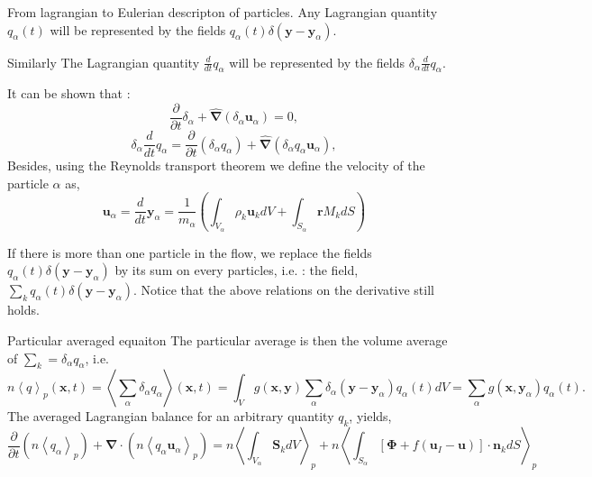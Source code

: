 \documentclass{sintefbeamer}
\newcommand{\avg}[1]{\left<#1\right>}
\newcommand{\pavg}[1]{n \left<#1\right>_p}
\newcommand{\nablab}{\bm{\nabla}}
\newcommand{\nablabh}{\hat{\bm{\nabla}}}
\newcommand{\ddt}{\frac{d}{d t}}
\newcommand{\pddt}{\frac{\partial}{\partial t}}
\begin{document}
\begin{frame}{From lagrangian to Eulerian descripton of particles.}
  Any Lagrangian quantity $q_\alpha(t)$ will be represented by the fields $q_\alpha(t)\delta(\textbf{y}-\textbf{y}_\alpha)$.

  Similarly The Lagrangian quantity $\ddt q_\alpha$ will be represented by the fields $\delta_\alpha \ddt q_\alpha$.

  It can be shown that : 
  \begin{equation*}
    \pddt \delta_\alpha
    + \nablabh (\delta_\alpha \textbf{u}_\alpha)
    = 0,
    \label{eq:delta_q_alpha_dt}
\end{equation*}
\begin{equation*}
    \delta_\alpha \ddt q_\alpha
    = \pddt (\delta_\alpha q_\alpha)
    + \nablabh (\delta_\alpha q_\alpha \textbf{u}_\alpha),
    \label{eq:delta_q_alpha_dt}
\end{equation*}
Besides, using the Reynolds transport theorem we define the velocity of the particle $\alpha$ as,  
\begin{equation*}
  \textbf{u}_\alpha
  = \ddt \textbf{y}_\alpha
  = \frac{1}{m_\alpha} \left(
      \int_{V_\alpha} \rho_k \textbf{u}_k dV
      +  \int_{S_\alpha} \textbf{r} M_k dS
  \right)
\end{equation*}

If there is more than one particle in the flow, we replace the fields $q_\alpha(t)\delta(\textbf{y}-\textbf{y}_\alpha)$ by its sum on every particles, i.e. : the field, $\sum_k q_\alpha(t)\delta(\textbf{y}-\textbf{y}_\alpha)$.
Notice that the above relations on the derivative still holds.
\end{frame}


\begin{frame}{Particular averaged equaiton}  
  The particular average is then the volume average of $\sum_k = \delta_\alpha q_\alpha$, i.e.
  \begin{equation*}
    \pavg{q}(\textbf{x},t)
    = \avg{\sum_\alpha \delta_\alpha q_\alpha} (\textbf{x},t)
    = \int_V g(\textbf{x},\textbf{y}) \sum_\alpha \delta_\alpha(\textbf{y}- \textbf{y}_\alpha) q_\alpha(t) dV 
    =  \sum_\alpha g(\textbf{x},\textbf{y}_\alpha) q_\alpha(t).
\end{equation*}
The averaged Lagrangian balance for an arbitrary quantity $q_k$, yields, 
\begin{equation}
  \pddt   \left(\pavg{q_\alpha}\right)
  + \nablab \cdot \left(\pavg{q_\alpha \textbf{u}_\alpha}\right) 
  = \pavg{\int_{V_\alpha} \textbf{S}_k dV}
  + \pavg{\int_{S_\alpha} \left[\bm{\Phi} + f (\textbf{u}_I-\textbf{u}) \right] \cdot \textbf{n}_k d S}
  \label{eq:avg_p_global}
\end{equation}
\end{frame}
\end{document}
